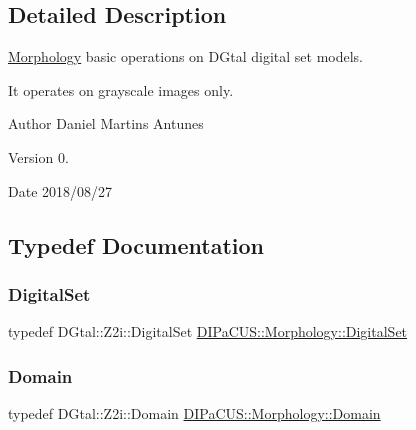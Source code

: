 \subsection{Detailed Description}
\mbox{\hyperlink{namespaceDIPaCUS_1_1Morphology}{Morphology}} basic operations on D\+Gtal digital set models. 

It operates on grayscale images only. \begin{DoxyAuthor}{Author}
Daniel Martins Antunes 
\end{DoxyAuthor}
\begin{DoxyVersion}{Version}
0. 
\end{DoxyVersion}
\begin{DoxyDate}{Date}
2018/08/27 
\end{DoxyDate}


\subsection{Typedef Documentation}
\mbox{\label{namespaceDIPaCUS_1_1Morphology_ab69fa725716b0ed4c311c0d00a292be7}} 
\subsubsection{\texorpdfstring{Digital\+Set}{DigitalSet}}
{\footnotesize\ttfamily typedef D\+Gtal\+::\+Z2i\+::\+Digital\+Set \mbox{\hyperlink{namespaceDIPaCUS_1_1Morphology_ab69fa725716b0ed4c311c0d00a292be7}{D\+I\+Pa\+C\+U\+S\+::\+Morphology\+::\+Digital\+Set}}}

\mbox{\label{namespaceDIPaCUS_1_1Morphology_ab9f5fc1118b80b969855f77bee7d9914}} 
\subsubsection{\texorpdfstring{Domain}{Domain}}
{\footnotesize\ttfamily typedef D\+Gtal\+::\+Z2i\+::\+Domain \mbox{\hyperlink{namespaceDIPaCUS_1_1Morphology_ab9f5fc1118b80b969855f77bee7d9914}{D\+I\+Pa\+C\+U\+S\+::\+Morphology\+::\+Domain}}}

